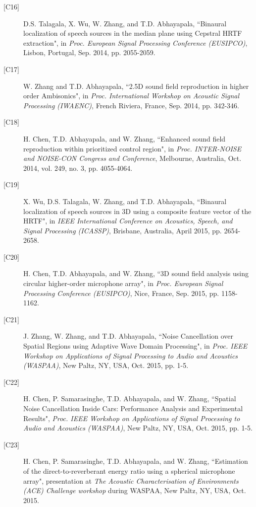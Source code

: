 \documentclass[10pt]{article}
\begin{document}
\begin{description}
\item[{[}C16{]}]D.S. Talagala, X. Wu, W. Zhang, and T.D. Abhayapala, ``Binaural localization of speech sources in the median plane using Cepstral HRTF extraction", in {\em Proc. European Signal Processing Conference (EUSIPCO)}, Lisbon, Portugal, Sep. 2014, pp. 2055-2059.

\item[{[}C17{]}]W. Zhang and T.D. Abhayapala, ``2.5D sound field reproduction in higher order Ambisonics", in {\em Proc. International Workshop on Acoustic Signal Processing (IWAENC)}, French Riviera, France, Sep. 2014, pp. 342-346.

\item[{[}C18{]}]H. Chen, T.D. Abhayapala, and W. Zhang, ``Enhanced sound field reproduction within prioritized control region", in {\em Proc. INTER-NOISE and NOISE-CON Congress and Conference}, Melbourne, Australia, Oct. 2014, vol. 249, no. 3, pp. 4055-4064.

\item[{[}C19{]}]X. Wu, D.S. Talagala,  W. Zhang, and T.D. Abhayapala, ``Binaural localization of speech sources in 3D using a composite feature vector of the HRTF", in {\em IEEE International Conference on Acoustics, Speech, and Signal Processing (ICASSP)}, Brisbane, Australia, April 2015, pp. 2654-2658.

\item[{[}C20{]}]H. Chen, T.D. Abhayapala, and W. Zhang, ``3D sound field analysis using circular higher-order microphone array", in {\em Proc. European Signal Processing Conference (EUSIPCO)}, Nice, France, Sep. 2015, pp. 1158-1162.

\item[{[}C21{]}]J. Zhang, W. Zhang, and T.D. Abhayapala, ``Noise Cancellation over Spatial Regions using Adaptive Wave Domain Processing", in {\em Proc. IEEE Workshop on Applications of Signal Processing to Audio and Acoustics (WASPAA)},  New Paltz, NY, USA, Oct. 2015, pp. 1-5.

\item[{[}C22{]}]H. Chen, P. Samarasinghe, T.D. Abhayapala, and W. Zhang, ``Spatial Noise Cancellation Inside Cars: Performance Analysis and Experimental Results",  {\em Proc. IEEE Workshop on Applications of Signal Processing to Audio and Acoustics (WASPAA)},  New Paltz, NY, USA, Oct. 2015, pp. 1-5.

\item[{[}C23{]}]H. Chen, P. Samarasinghe, T.D. Abhayapala, and W. Zhang, ``Estimation of the direct-to-reverberant energy ratio using a spherical microphone array", presentation at {\em The Acoustic Characterisation of Environments (ACE) Challenge workshop} during WASPAA,  New Paltz, NY, USA, Oct. 2015.


\end{description}
\end{document}
